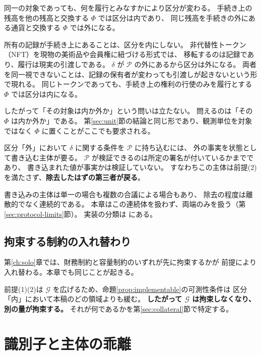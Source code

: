 \begin{remark}
\label{rem:case-is-phi}
同一の対象であっても、何を履行とみなすかにより区分が変わる。
手続き上の残高を他の残高と交換する $\Phi$ では区分は内であり、
同じ残高を手続きの外にある通貨と交換する $\Phi$ では外になる。

所有の記録が手続き上にあることは、区分を内にしない。
非代替性トークン（NFT）を現物の美術品や会員権に紐づける形式では、
移転するのは記録であり、履行は現実の引渡しである。
$\delta$ が $\mathcal{P}$ の外にあるから区分は外になる。
両者を同一視できないことは、記録の保有者が変わっても引渡しが起きないという形で現れる。
同じトークンであっても、手続き上の権利の行使のみを履行とする $\Phi$ では区分は内になる。

したがって「その対象は内か外か」という問いは立たない。
問えるのは「その $\Phi$ は内か外か」である。
第\ref{sec:unit}節の結論と同じ形であり、観測単位を対象ではなく $\Phi$ に置くことがここでも要求される。
\end{remark}

\begin{remark}[区分「外」における仲介]
\label{rem:oracle}
区分「外」において $\delta$ に関する条件を $\mathcal{P}$ に持ち込むには、
外の事実を状態として書き込む主体が要る。
$\mathcal{P}$ が検証できるのは所定の署名が付いているかまでであり、
書き込まれた値が事実かは検証していない。
すなわちこの主体は前提(2)を満たさず、\textbf{除去したはずの第三者が戻る}。

書き込みの主体は単一の場合も複数の合議による場合もあり、
除去の程度は離散的でなく連続的である。
本章はこの連続体を扱わず、両端のみを扱う（第\ref{sec:protocol-limits}節）。
実装の分類は \cite{pasdar2023} にある。
\end{remark}

\subsection{拘束する制約の入れ替わり}

第\ref{ch:solo}章では、財務制約と容量制約のいずれが先に拘束するかが
前提により入れ替わる。本章でも同じことが起きる。

前提(1)(2)は $\mathcal{G}$ を広げるため、命題\ref{prop:implementable}の可測性条件は
区分「内」において本稿のどの領域よりも緩む。
\textbf{したがって $\mathcal{G}$ は拘束しなくなり、別の量が拘束する。}
それが何であるかを第\ref{sec:collateral}節で特定する。

\section{識別子と主体の乖離}
\label{sec:identifier}

